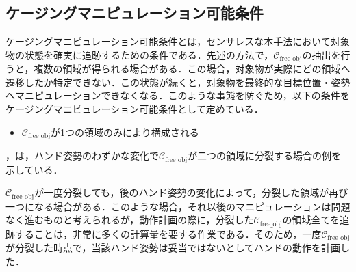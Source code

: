 \documentclass[a4paper,twoside,12pt,papersize, dvipdfmx]{iirthesis}
\begin{document}
\subsection*{ケージングマニピュレーション可能条件}
ケージングマニピュレーション可能条件とは，センサレスな本手法において対象物の状態を確実に追跡するための条件である．先述の方法で，$\mathcal{C}_{\mathrm{free\_obj}}$の抽出を行うと，複数の領域が得られる場合がある．この場合，対象物が実際にどの領域へ遷移したか特定できない．この状態が続くと，対象物を最終的な目標位置・姿勢へマニピュレーションできなくなる．このような事態を防ぐため，以下の条件をケージングマニピュレーション可能条件として定めている．
\begin{itemize}
\item $\mathcal{C}_{\mathrm{free\_obj}}$が1つの領域のみにより構成される
\end{itemize}

\figref{}，\figref{}は，ハンド姿勢のわずかな変化で$\mathcal{C}_{\mathrm{free\_obj}}$が二つの領域に分裂する場合の例を示している．\par
$\mathcal{C}_{\mathrm{free\_obj}}$が一度分裂しても，後のハンド姿勢の変化によって，分裂した領域が再び一つになる場合がある．このような場合，それ以後のマニピュレーションは問題なく進むものと考えられるが，動作計画の際に，分裂した$\mathcal{C}_{\mathrm{free\_obj}}$の領域全てを追跡することは，非常に多くの計算量を要する作業である．そのため，一度$\mathcal{C}_{\mathrm{free\_obj}}$が分裂した時点で，当該ハンド姿勢は妥当ではないとしてハンドの動作を計画した．
\end{document}
